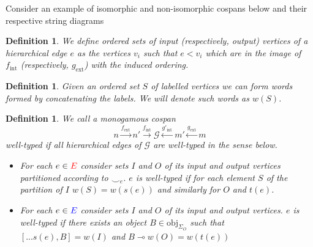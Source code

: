 \documentclass[acmsmall, screen, nonacm]{acmart}
\newcommand{\consistency}{{\smile}}
\newtheorem{definition}[theorem]{Definition}
\begin{document}
Consider an example of isomorphic and non-isomorphic cospans below and their respective string diagrams

\begin{figure}
  \begin{subfigure}[c]{0.4\linewidth}
  \end{subfigure}
  \hfill
  \begin{subfigure}[c]{0.4\linewidth}
  \end{subfigure}
\end{figure}

\begin{definition}

We define ordered sets of \textit{input} (respectively, \textit{output}) vertices of a hierarchical edge $e$ as the vertices $v_{i}$ such that $e < v_{i}$ which are in the image of $f_{\text{int}}$ (respectively, $g_{\text{ext}}$) with the induced ordering.
\end{definition}

\begin{definition}

Given an ordered set $S$ of labelled vertices we can form words formed by concatenating the labels.
We will denote such words as $w(S)$.
\end{definition}

\begin{definition}
We call a monogamous cospan
\[
  n \xrightarrow{f_{\text{ext}}} n' \xrightarrow{f_{\text{int}}} \mathcal{G} \xleftarrow{g'_{\text{int}}} m' \xleftarrow{g_{\text{ext}}} m
\]
\textit{well-typed} if all hierarchical edges of $\mathcal{G}$ are well-typed in the sense below.
\begin{itemize}
  \item For each $e \in \textcolor{red}{E}$ consider sets $I$ and $O$ of its input and output vertices partitioned according to $\consistency_{e}$.
        $e$ is well-typed if for each element $S$ of the partition of $I$ $w(S) = w(s(e))$ and similarly for $O$ and $t(e)$.
  \item For each $e \in \textcolor{blue}{E}$ consider sets $I$ and $O$ of its input and output vertices.
        $e$ is well-typed if there exists an object $B \in \text{obj}_{\Sigma_{O}}$ such that $[...s(e), B] = w(I)$ and $B \multimap w(O) = w(t(e))$
\end{itemize}
\end{definition}
\end{document}

